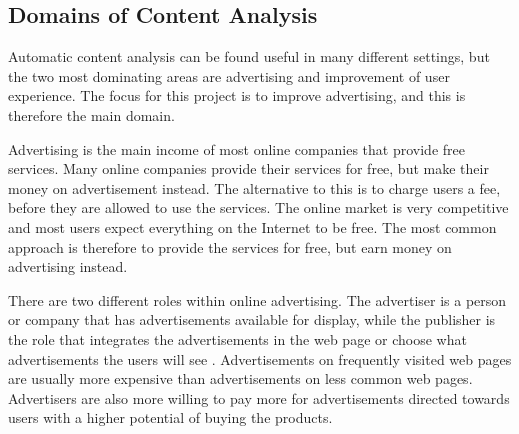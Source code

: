 \subsection{Domains of Content Analysis}
Automatic content analysis can be found useful in many different settings, but the 
two most dominating areas are advertising and improvement of user experience. The focus for this project is to improve advertising, and this is therefore the main domain.

Advertising is the main income of most online companies that provide free services. Many online companies provide their services for free, but make their money on advertisement instead. The alternative to this is to charge users a fee, before they are allowed to use the services. The online market is very competitive and most users expect everything on the Internet to be free. The most common approach is therefore to provide the services for free, but earn money on advertising instead. 

There are two different roles within online advertising. The advertiser is a person or company that has advertisements available for display, while the publisher is the role that integrates the advertisements in the web page or choose what advertisements the users will see \cite{wiki:onlineadvertising}. Advertisements on frequently visited web pages are usually more expensive than advertisements on less common web pages. Advertisers are also more willing to pay more for advertisements directed towards users with a higher potential of buying the products. 




